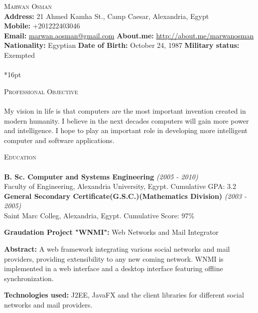 \documentclass[letterpaper,12pt]{article}
\author{Marwan Osman}
\newcommand{\lineunder}{\vspace*{-8pt} \\ \hspace*{-8pt} \hrulefill \\}
\newcommand{\interval}[1] { \textit{(#1)} }
\newcommand{\header}[1]{{\hspace*{0pt}\vspace*{6pt} \textsc{#1}} \vspace*{-6pt} \lineunder}
\newcommand{\education}[3]{{\textbf{#1} \interval{#2}\\{#3}\\ }}
\newcommand{\objective}[1]{{#1\\\vspace*{8pt}}}
\newcommand{\contact}[3]{
\vspace*{-8pt}
{\LARGE \scshape {#1}}\\
#2 \lineunder 
#3
\vspace*{-8pt}
}
\newenvironment{details}{\vspace*{-4pt} \begin{list}{\topsep 0pt \itemsep -2pt}}{\vspace*{4pt}\end{list}}
\begin{document}
\small
\smallskip
\vspace*{-30pt}

\contact{Marwan Osman}
{\textbf{Address:} 21 Ahmed Kamha St., Camp Caesar, Alexandria, Egypt
\\\textbf{Mobile:} +201222403046
\\\textbf{Email:} \href{mailto:marwan.aosman@gmail.com}{marwan.aosman@gmail.com} \textbf{About.me:} \url{http://about.me/marwanosman}
\\\textbf{Nationality:} Egyptian  \textbf{Date of Birth:} October 24, 1987  \textbf{Military status:} Exempted
}

\vspace*{16pt}

\header{Professional Objective}
\objective{ My vision in life is that computers are the most important invention created in modern humanity. I believe in the next decades computers will gain more power and intelligence. I hope to play an important role in developing more intelligent computer and software applications.}

\header{Education}
\education{B. Sc. Computer and Systems Engineering}{2005 - 2010}{Faculty of Engineering, Alexandria University, Egypt. Cumulative GPA: 3.2}
\vspace*{4pt}
\education{General Secondary Certificate(G.S.C.)(Mathematics Division)}{2003 - 2005}{Saint Marc Colleg, Alexandria, Egypt. Cumulative Score: 97\%}
  \begin{details}
    \item \textbf{ Graudation Project "WNMI":} Web Networks and Mail Integrator
    \item \textbf{ Abstract:} A web framework integrating various social networks and mail providers, providing extensibility to any new coming network. WNMI is implemented in a web interface and a desktop interface featuring offline synchronization.
    \item \textbf{ Technologies used:} J2EE, JavaFX and the client libraries for different social networks and mail providers.
  \end{details}
\vspace*{4pt}
\end{document}
